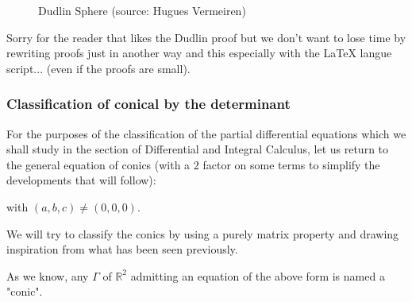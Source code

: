 \begin{figure}[H]
\begin{center}
	\end{center}
		\caption[Dudlin Sphere]{Dudlin Sphere (source: Hugues Vermeiren)}
	\end{figure}
	Sorry for the reader that likes the Dudlin proof but we don't want to lose time by rewriting proofs just in another way and this especially with the \LaTeX{} langue script... (even if the proofs are small). 
	
	\subsubsection{Classification of conical by the determinant}\label{classification of conical by the determinant}
	For the purposes of the classification of the partial differential equations which we shall study in the section of Differential and Integral Calculus, let us return to the general equation of conics (with a $2$ factor on some terms to simplify the developments that will follow):
	
	with $(a,b,c)\neq (0,0,0)$. 

	We will try to classify the conics by using a purely matrix property and drawing inspiration from what has been seen previously.

	As we know, any $\Gamma$ of $\mathbb{R}^2$ admitting an equation of the above form is named a "conic".

